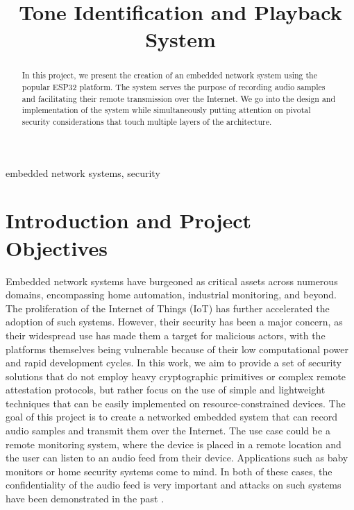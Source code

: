 \documentclass[conference]{IEEEtran}
\begin{document}
\title{Tone Identification and Playback System}

\author{
\and
{}
}

\maketitle

\begin{abstract}
    In this project, we present the creation of an
    embedded network system using the popular ESP32 platform. The system serves
    the purpose of recording audio samples and facilitating their remote
    transmission over the Internet. We go into the design and implementation
    of the system while simultaneously putting attention
    on pivotal security considerations that touch multiple
    layers of the architecture. 
\end{abstract}

\begin{IEEEkeywords}
embedded network systems, security
\end{IEEEkeywords}

\section{Introduction and Project Objectives}

Embedded network systems have burgeoned as critical assets across numerous
domains, encompassing home automation, industrial monitoring, and beyond. 
The proliferation of the Internet of Things (IoT) has further accelerated the
adoption of such systems\cite{IotTechEmbedded}.
However, their security has been a major concern,\cite{EmbeddedSecSurveyEU}
as their widespread use has made them a target for malicious actors, 
with the platforms themselves being vulnerable because of their low computational power and
rapid development cycles\cite{EmbeddedSecChallenges}.
In this work, we aim to provide a set of security solutions that do not employ 
heavy cryptographic primitives or complex remote attestation protocols, but rather
focus on the use of simple and lightweight techniques that can be easily implemented
on resource-constrained devices.
The goal of this project is to create a networked embedded system that can record audio samples and transmit them over the Internet.
The use case could be a remote monitoring system, where the device is placed in a remote location and 
the user can listen to an audio feed from their device. Applications such as baby monitors or home security systems come to mind.
In both of these cases, the confidentiality of the audio feed is very important and
attacks on such systems have been demonstrated in the past \cite{BabyMonitorHack, VideoSurvAttacks}.
\end{document}
